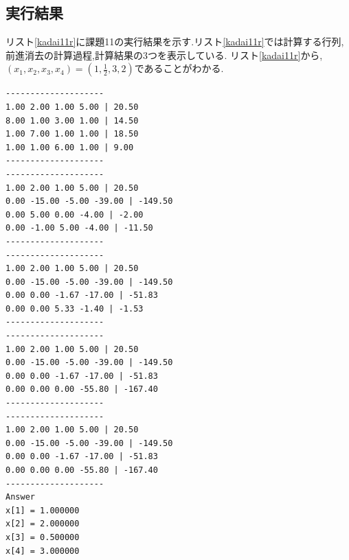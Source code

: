 \documentclass[a4j]{jarticle}
\begin{document}
      \subsection{実行結果}
      リスト\ref{kadai11r}に課題11の実行結果を示す.リスト\ref{kadai11r}では計算する行列,前進消去の計算過程,計算結果の3つを表示している.
      リスト\ref{kadai11r}から,$(x_1,x_2,x_3,x_4)=(1,\frac{1}{2},3,2)$であることがわかる.
      \begin{lstlisting}[basicstyle=\ttfamily\footnotesize, frame=single,label=kadai11r,caption=課題11の実行結果]
--------------------
1.00 2.00 1.00 5.00 | 20.50
8.00 1.00 3.00 1.00 | 14.50
1.00 7.00 1.00 1.00 | 18.50
1.00 1.00 6.00 1.00 | 9.00
--------------------
--------------------
1.00 2.00 1.00 5.00 | 20.50
0.00 -15.00 -5.00 -39.00 | -149.50
0.00 5.00 0.00 -4.00 | -2.00
0.00 -1.00 5.00 -4.00 | -11.50
--------------------
--------------------
1.00 2.00 1.00 5.00 | 20.50
0.00 -15.00 -5.00 -39.00 | -149.50
0.00 0.00 -1.67 -17.00 | -51.83
0.00 0.00 5.33 -1.40 | -1.53
--------------------
--------------------
1.00 2.00 1.00 5.00 | 20.50
0.00 -15.00 -5.00 -39.00 | -149.50
0.00 0.00 -1.67 -17.00 | -51.83
0.00 0.00 0.00 -55.80 | -167.40
--------------------
--------------------
1.00 2.00 1.00 5.00 | 20.50
0.00 -15.00 -5.00 -39.00 | -149.50
0.00 0.00 -1.67 -17.00 | -51.83
0.00 0.00 0.00 -55.80 | -167.40
--------------------
Answer
x[1] = 1.000000
x[2] = 2.000000
x[3] = 0.500000
x[4] = 3.000000      
      \end{lstlisting}
\end{document}
